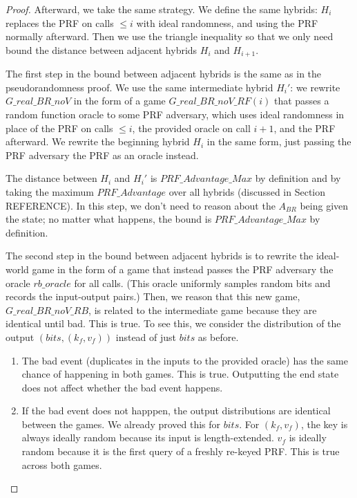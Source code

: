 \documentclass[12pt,lot, lof]{puthesis}
\begin{document}
\begin{proof}
Afterward, we take the same strategy. We define the same hybrids: $H_i$ replaces the PRF on calls $\leq i$ with ideal randomness, and using the PRF normally afterward. Then we use the triangle inequality so that we only need bound the distance between adjacent hybrids $H_i$ and $H_{i+1}$.

The first step in the bound between adjacent hybrids is the same as in the pseudorandomness proof. We use the same intermediate hybrid $H_i'$: we rewrite $G\_real\_BR\_noV$ in the form of a game $G\_real\_BR\_noV\_RF(i)$ that passes a random function oracle to some PRF adversary, which uses ideal randomness in place of the PRF on calls $\leq i$, the provided oracle on call $i+1$, and the PRF afterward. We rewrite the beginning hybrid $H_i$ in the same form, just passing the PRF adversary the PRF as an oracle instead.

The distance between $H_i$ and $H_i'$ is $PRF\_Advantage\_Max$ by definition and by taking the maximum $PRF\_Advantage$ over all hybrids (discussed in Section REFERENCE). In this step, we don't need to reason about the $A_{BR}$ being given the state; no matter what happens, the bound is $PRF\_Advantage\_Max$ by definition.

The second step in the bound between adjacent hybrids is to rewrite the ideal-world game in the form of a game that instead passes the PRF adversary the oracle $rb\_oracle$ for all calls. (This oracle uniformly samples random bits and records the input-output pairs.) Then, we reason that this new game, $G\_real\_BR\_noV\_RB$, is related to the intermediate game because they are identical until bad. This is true. To see this, we consider the distribution of the output $(bits, (k_f, v_f))$ instead of just $bits$ as before.

\begin{enumerate}
\item The bad event (duplicates in the inputs to the provided oracle) has the same chance of happening in both games. This is true. Outputting the end state does not affect whether the bad event happens.
\item If the bad event does not happpen, the output distributions are identical between the games. We already proved this for $bits$. For $(k_f, v_f)$, the key is always ideally random because its input is length-extended. $v_f$ is ideally random because it is the first query of a freshly re-keyed PRF. This is true across both games.
\end{enumerate}


\end{proof}
\end{document}
